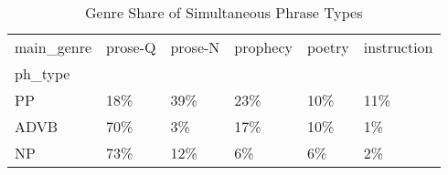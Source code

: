\begin{table}[htbp!]
\centering
\caption{Genre Share of Simultaneous Phrase Types}
\label{table:simgenph_pc}
\begin{tabular}{llllll}
\toprule
main\_genre & prose-Q & prose-N & prophecy & poetry & instruction \\
ph\_type &         &         &          &        &             \\
\midrule
PP      &     18\% &     39\% &      23\% &    10\% &         11\% \\
ADVB    &     70\% &      3\% &      17\% &    10\% &          1\% \\
NP      &     73\% &     12\% &       6\% &     6\% &          2\% \\
\bottomrule
\end{tabular}
\end{table}
